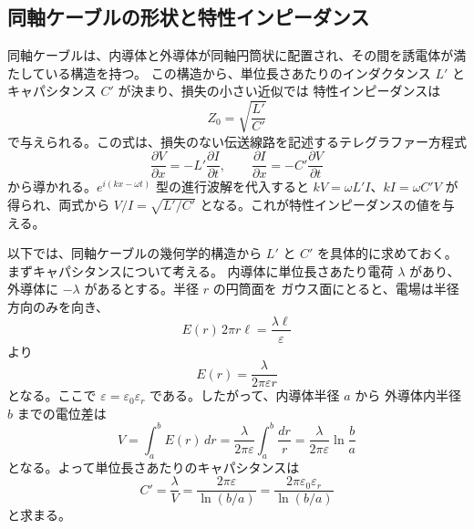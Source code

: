 \documentclass[uplatex,dvipdfmx,12pt,nomag]{jsarticle}
\begin{document}
\subsection{同軸ケーブルの形状と特性インピーダンス}

同軸ケーブルは、内導体と外導体が同軸円筒状に配置され、その間を誘電体が満たしている構造を持つ。
この構造から、単位長さあたりのインダクタンス $L'$ とキャパシタンス $C'$ が決まり、損失の小さい近似では
特性インピーダンスは
\begin{equation}
  Z_0 = \sqrt{\frac{L'}{C'}}
\end{equation}
で与えられる。この式は、損失のない伝送線路を記述するテレグラファー方程式
\begin{equation}
  \frac{\partial V}{\partial x} = -L' \frac{\partial I}{\partial t},
  \qquad
  \frac{\partial I}{\partial x} = -C' \frac{\partial V}{\partial t}
\end{equation}
から導かれる。$e^{i(kx - \omega t)}$ 型の進行波解を代入すると $kV = \omega L' I$、$kI = \omega C' V$
が得られ、両式から $V/I = \sqrt{L'/C'}$ となる。これが特性インピーダンスの値を与える。

以下では、同軸ケーブルの幾何学的構造から $L'$ と $C'$ を具体的に求めておく。まずキャパシタンスについて考える。
内導体に単位長さあたり電荷 $\lambda$ があり、外導体に $-\lambda$ があるとする。半径 $r$ の円筒面を
ガウス面にとると、電場は半径方向のみを向き、
\begin{equation}
  E(r)\,2\pi r \ell = \frac{\lambda \ell}{\varepsilon}
\end{equation}
より
\begin{equation}
  E(r) = \frac{\lambda}{2\pi \varepsilon r}
\end{equation}
となる。ここで $\varepsilon=\varepsilon_0\varepsilon_r$ である。したがって、内導体半径 $a$ から
外導体内半径 $b$ までの電位差は
\begin{equation}
  V = \int_a^b E(r)\,dr
    = \frac{\lambda}{2\pi\varepsilon}\int_a^b \frac{dr}{r}
    = \frac{\lambda}{2\pi\varepsilon}\ln\frac{b}{a}
\end{equation}
となる。よって単位長さあたりのキャパシタンスは
\begin{equation}
  C' = \frac{\lambda}{V}
     = \frac{2\pi\varepsilon}{\ln(b/a)}
     = \frac{2\pi\varepsilon_0\varepsilon_r}{\ln(b/a)}
\end{equation}
と求まる。
\end{document}
